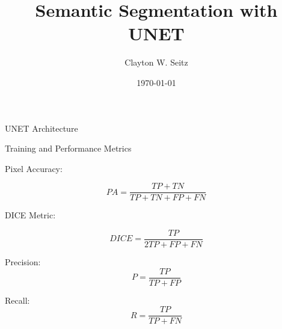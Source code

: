 \documentclass[aspectratio=1610]{beamer}					%
\title{Semantic Segmentation with UNET}	%
\author{Clayton W. Seitz}								%
\date{\today}									%
\begin{document}
\begin{frame}
  \titlepage
\end{frame}

\begin{frame}{UNET Architecture}

\end{frame}

\begin{frame}{Training and Performance Metrics}

Pixel Accuracy: 

\begin{equation*}
PA = \frac{TP+TN}{TP+TN+FP+FN}
\end{equation*}

DICE Metric: 

\begin{equation*}
DICE = \frac{TP}{2TP+FP+FN}
\end{equation*}

Precision:
\begin{equation*}
P = \frac{TP}{TP+FP}
\end{equation*}

Recall:
\begin{equation*}
R = \frac{TP}{TP+FN}
\end{equation*}

\end{frame}
\end{document}
